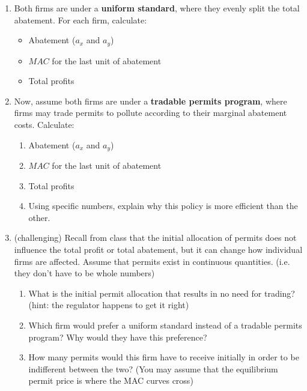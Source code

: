 \documentclass[11pt]{article}
\begin{document}
\begin{enumerate}
    \item  Both firms are under a \textbf{uniform standard}, where they evenly split the total abatement. For each firm, calculate:
    \begin{itemize}
        \item Abatement ($a_x$ and $a_y$)
        
        \item $MAC$ for the last unit of abatement
        
        \item Total profits
    \end{itemize}
    
    \item  Now, assume both firms are under a \textbf{tradable permits program}, where firms may trade permits to pollute according to their marginal abatement costs. Calculate:
    \begin{enumerate}
        \item Abatement ($a_x$ and $a_y$)
        
        \item $MAC$ for the last unit of abatement
        
        \item Total profits
        
        \item Using specific numbers, explain why this policy is more efficient than the other.
    \end{enumerate}
    
    \item  (challenging) Recall from class that the initial allocation of permits does not influence the total profit or total abatement, but it can change how individual firms are affected. Assume that permits exist in continuous quantities. (i.e. they don’t have to be whole numbers)
    \begin{enumerate}
        \item What is the initial permit allocation that results in no need for trading? (hint: the regulator happens to get it right)
        
        \item Which firm would prefer a uniform standard instead of a tradable permits program? Why would they have this preference?
        
        \item How many permits would this firm have to receive initially in order to be indifferent between the two? (You may assume that the equilibrium permit price is where the MAC curves cross)
    \end{enumerate}
\end{enumerate}
\end{document}

